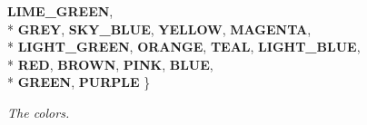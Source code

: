 \begin{DoxyCompactItemize}
{\bfseries L\+I\+M\+E\+\_\+\+G\+R\+E\+EN}, 
\\*
{\bfseries G\+R\+EY}, 
{\bfseries S\+K\+Y\+\_\+\+B\+L\+UE}, 
{\bfseries Y\+E\+L\+L\+OW}, 
{\bfseries M\+A\+G\+E\+N\+TA}, 
\\*
{\bfseries L\+I\+G\+H\+T\+\_\+\+G\+R\+E\+EN}, 
{\bfseries O\+R\+A\+N\+GE}, 
{\bfseries T\+E\+AL}, 
{\bfseries L\+I\+G\+H\+T\+\_\+\+B\+L\+UE}, 
\\*
{\bfseries R\+ED}, 
{\bfseries B\+R\+O\+WN}, 
{\bfseries P\+I\+NK}, 
{\bfseries B\+L\+UE}, 
\\*
{\bfseries G\+R\+E\+EN}, 
{\bfseries P\+U\+R\+P\+LE}
 \}\begin{DoxyCompactList}\small\item\em The colors. \end{DoxyCompactList}
\end{DoxyCompactItemize}
